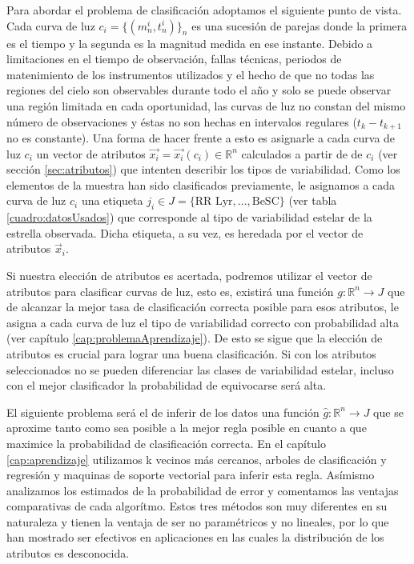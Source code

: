 \documentclass[letterpaper,12pt]{book}
\begin{document}
Para abordar el problema de clasificación adoptamos el siguiente punto de vista. Cada curva de luz $c_i = \{(m_{n}^{i}, t_{n}^{i})\}_{n}$ es una sucesión de parejas donde la primera es el tiempo y la segunda es la magnitud medida en ese instante.  Debido a limitaciones en el tiempo de observación, fallas técnicas, periodos de matenimiento de los instrumentos utilizados y el hecho de que no todas las regiones del cielo son observables durante todo el año y solo se puede observar una región limitada en cada oportunidad, las curvas de luz no constan del mismo número de observaciones y éstas no son hechas en intervalos regulares ($t_{k} - t_{k+1}$ no es constante). Una forma de hacer frente a esto es asignarle a cada curva de luz $c_i$ un vector de atributos $\vec{x_{i}} = \vec{x_{i}}(c_i)\in\mathbb{R}^{n}$ calculados a partir de de $c_i$ (ver sección \ref{sec:atributos}) que intenten describir los tipos de variabilidad. Como los elementos de la muestra han sido clasificados previamente, le asignamos a cada curva de luz $c_i$ una etiqueta $j_i\in J=\{\text{RR Lyr}, \dots, \text{BeSC}\}$ (ver tabla \ref{cuadro:datosUsados}) que corresponde al tipo de variabilidad estelar de la estrella observada.  Dicha etiqueta, a su vez, es heredada por el vector de atributos $\vec{x}_i$.

Si nuestra elección de atributos es acertada, podremos utilizar el vector de atributos para clasificar curvas de luz, esto es, existirá una función $g:\mathbb{R}^n\rightarrow J$ que de alcanzar la mejor tasa de clasificación correcta posible para esos atributos, le asigna a cada curva de luz el tipo de variabilidad correcto con probabilidad alta (ver capítulo \ref{cap:problemaAprendizaje}). De esto se sigue que la elección de atributos es crucial para lograr una buena clasificación. Si con los atributos seleccionados no se pueden diferenciar las clases de variabilidad estelar, incluso con el mejor clasificador la probabilidad de equivocarse será alta.

El siguiente problema será el de inferir de los datos una función $\hat{g}:\mathbb{R}^n\rightarrow J$ que se aproxime tanto como sea posible a la mejor regla posible en cuanto a que maximice la probabilidad de clasificación correcta. En el capítulo \ref{cap:aprendizaje} utilizamos k vecinos más cercanos, arboles de clasificación y regresión y maquinas de soporte vectorial para inferir esta regla. Asímismo analizamos los estimados de la probabilidad de error y comentamos las ventajas comparativas de cada algorítmo. Estos tres métodos son muy diferentes en su naturaleza y tienen la ventaja de ser no paramétricos y no lineales, por lo que han mostrado ser efectivos en aplicaciones en las cuales la distribución de los atributos es desconocida. 
\end{document}
